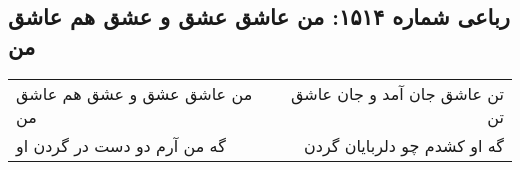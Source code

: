 \begin{center}
\section*{رباعی شماره ۱۵۱۴: من عاشق عشق و عشق هم عاشق من}
\label{sec:1514}
\begin{longtable}{l p{0.5cm} r}
من عاشق عشق و عشق هم عاشق من
&&
تن عاشق جان آمد و جان عاشق تن
\\
گه من آرم دو دست در گردن او
&&
گه او کشدم چو دلربایان گردن
\\
\end{longtable}
\end{center}
